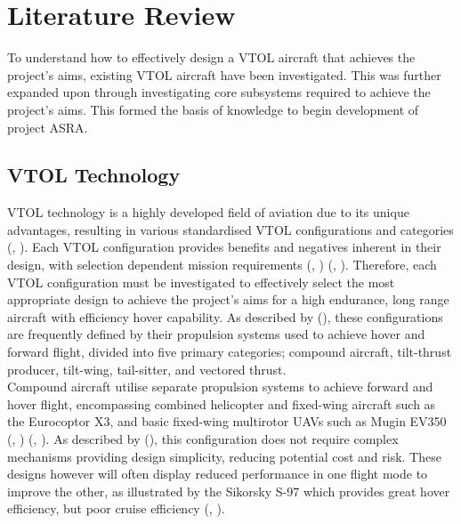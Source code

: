 \clearpage

\section{Literature Review}

To understand how to effectively design a VTOL aircraft that achieves the project’s aims, existing VTOL aircraft have been investigated. This was further expanded upon through investigating core subsystems required to achieve the project’s aims. This formed the basis of knowledge to begin development of project ASRA.

\subsection{VTOL Technology}

VTOL technology is a highly developed field of aviation due to its unique advantages, resulting in various standardised VTOL configurations and categories (\citeauthor{RN15}, \citeyear{RN15}). Each VTOL configuration provides benefits and negatives inherent in their design, with selection dependent mission requirements (\citeauthor{hirschberg2006overview}, \citeyear{hirschberg2006overview}) (\citeauthor{RN15}, \citeyear{RN15}). Therefore, each VTOL configuration must be investigated to effectively select the most appropriate design to achieve the project’s aims for a high endurance, long range aircraft with efficiency hover capability. As described by \citeauthor{hirschberg2006overview} (\citeyear{hirschberg2006overview}), these configurations are frequently defined by their propulsion systems used to achieve hover and forward flight, divided into five primary categories; compound aircraft, tilt-thrust producer, tilt-wing, tail-sitter, and vectored thrust. \\

Compound aircraft utilise separate propulsion systems to achieve forward and hover flight, encompassing combined helicopter and fixed-wing aircraft such as the Eurocoptor X3, and basic fixed-wing multirotor UAVs such as Mugin EV350 (\citeauthor{RN15}, \citeyear{RN15}) (\citeauthor{Mugin}, \citeyear{Mugin}). As described by \citeauthor{dundar2020design} (\citeyear{dundar2020design}), this configuration does not require complex mechanisms providing design simplicity, reducing potential cost and risk. These designs however will often display reduced performance in one flight mode to improve the other, as illustrated by the Sikorsky S-97 which provides great hover efficiency, but poor cruise efficiency (\citeauthor{RN15}, \citeyear{RN15}). \\

